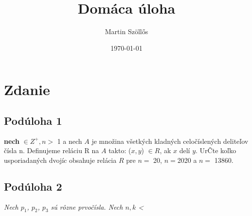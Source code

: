 \documentclass{article}
\title{Domáca úloha}
\author{Martin Szöllős}
\date{\today}
\begin{document}
\maketitle

\section{Zdanie}
\subsection{Podúloha 1}
\textbf{nech} $\in  Z^+, n >$ 1 a nech $A$ je množina všetkých kladných celočíslených deliteľov čísla n. Definujeme reláciu R na $A$ takto: ($x,y$) $\in R$, ak $x$ delí $y$. UrČte koľko usporiadaných dvojíc obsahuje relácia $R$ pre $n =$ 20, $n = $2020 a $n =$ 13860.
\subsection{Podúloha 2}

\textit{Nech $p_1$, $p_2$, $p_3$ sú rôzne prvočísla. Nech $n,k$ <}
\end{document}
